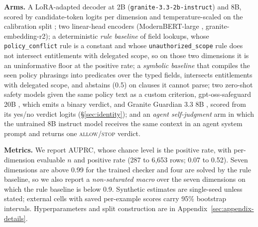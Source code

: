 \textbf{Arms.} A LoRA-adapted decoder \citep{hu2021lora} at 2B
(\texttt{granite-3.3-2b-instruct}) and 8B, scored by candidate-token logits
per dimension and temperature-scaled on the calibration split
\citep{guo2017calibration}; two linear-head encoders (ModernBERT-large
\citep{warner2024modernbert}, granite-embedding-r2); a deterministic
\emph{rule baseline} of field lookups, whose \texttt{policy\_conflict} rule is
a constant and whose \texttt{unauthorized\_scope} rule does not intersect
entitlements with delegated scope, so on those two dimensions it is an
uninformative floor at the positive rate; a \emph{symbolic baseline} that
compiles the seen policy phrasings into predicates over the typed fields,
intersects entitlements with delegated scope, and abstains (0.5) on clauses it
cannot parse; two zero-shot safety models given the same policy text as a custom criterion,
gpt-oss-safeguard 20B \citep{openai2025gptosssafeguard}, which emits a binary
verdict, and Granite Guardian 3.3 8B \citep{padhi2024graniteguardian}, scored
from its yes/no verdict logits (\S\ref{sec:identity}); and an \emph{agent self-judgment} arm in which the untrained
8B instruct model \citep{ibm2024granite3} receives the same context in an
agent system prompt and returns one \textsc{allow}/\textsc{stop} verdict.

\textbf{Metrics.} We report AUPRC, whose chance level is the positive rate,
with per-dimension evaluable $n$ and positive rate (287 to 6,653 rows; 0.07
to 0.52). Seven dimensions are above 0.99 for the trained checker and four are
solved by the rule baseline, so we also report a \emph{non-saturated macro}
over the seven dimensions on which the rule baseline is below 0.9. Synthetic estimates are single-seed unless stated;
external cells with saved per-example scores carry 95\% bootstrap intervals.
Hyperparameters and split construction are in Appendix~\ref{sec:appendix-details}.

\FloatBarrier
